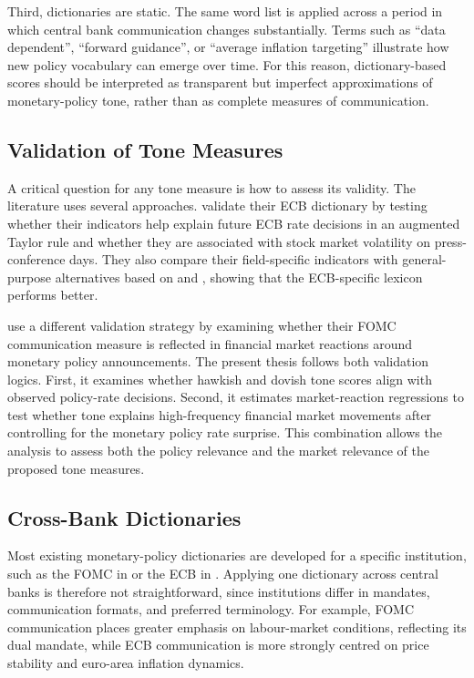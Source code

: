 Third, dictionaries are static. The same word list is applied across a
period in which central bank communication changes substantially. Terms
such as ``data dependent'', ``forward guidance'', or ``average inflation
targeting'' illustrate how new policy vocabulary can emerge over time.
For this reason, dictionary-based scores should be interpreted as
transparent but imperfect approximations of monetary-policy tone, rather
than as complete measures of communication.

\subsection{Validation of Tone Measures}
 
A critical question for any tone measure is how to assess its validity.
The literature uses several approaches. \citet{picault2017} validate
their ECB dictionary by testing whether their indicators help explain
future ECB rate decisions in an augmented Taylor rule and whether they
are associated with stock market volatility on press-conference days.
They also compare their field-specific indicators with general-purpose
alternatives based on \citet{loughran2011} and \citet{apel2014}, showing
that the ECB-specific lexicon performs better.

\citet{lucca2009} use a different validation strategy by examining
whether their FOMC communication measure is reflected in financial
market reactions around monetary policy announcements. The present
thesis follows both validation logics. First, it examines whether
hawkish and dovish tone scores align with observed policy-rate
decisions. Second, it estimates market-reaction regressions to test
whether tone explains high-frequency financial market movements after
controlling for the monetary policy rate surprise. This combination
allows the analysis to assess both the policy relevance and the market
relevance of the proposed tone measures.
 
\subsection{Cross-Bank Dictionaries}
 
Most existing monetary-policy dictionaries are developed for a specific
institution, such as the FOMC in \citet{lucca2009} or the ECB in
\citet{picault2017}. Applying one dictionary across central banks is
therefore not straightforward, since institutions differ in mandates,
communication formats, and preferred terminology. For example, FOMC
communication places greater emphasis on labour-market conditions,
reflecting its dual mandate, while ECB communication is more strongly
centred on price stability and euro-area inflation dynamics.

